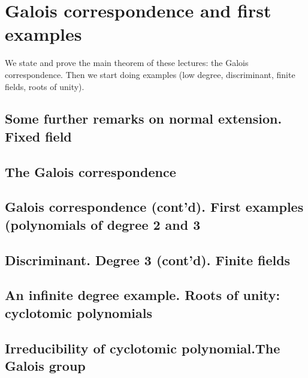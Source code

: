 \chapter{Galois correspondence and first examples}
We state and prove the main theorem of these lectures: the Galois
correspondence. Then we start doing examples (low degree,
discriminant, finite fields, roots of unity).


\section{Some further remarks on normal extension. Fixed field}
\section{The Galois correspondence}
\section{Galois correspondence (cont'd). First examples (polynomials
  of degree 2 and 3} 
\section{Discriminant. Degree 3 (cont'd). Finite fields}
\section{An infinite degree example. Roots of unity: cyclotomic polynomials}
\section{Irreducibility of cyclotomic polynomial.The Galois group}
